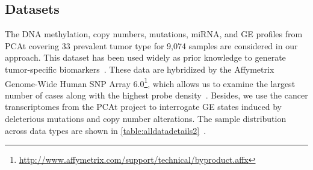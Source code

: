 \subsection{Datasets}
The DNA methylation, copy numbers, mutations, miRNA, and GE profiles from PCAt covering 33 prevalent tumor type for 9,074 samples are considered in our approach. This dataset has been used widely as prior knowledge to generate tumor-specific biomarkers~\cite{way2018machine,hoadley2018cell,malta2018machine}. These data are hybridized by the Affymetrix Genome-Wide Human SNP Array 6.0\footnote{\url{http://www.affymetrix.com/support/technical/byproduct.affx}}, which allows us to examine the largest number of cases along with the highest probe density~\cite{31Park}. Besides, we use the cancer transcriptomes from the PCAt project to interrogate GE states induced by deleterious mutations and copy number alterations. The sample distribution across data types are shown in \cref{table:alldatadetails2}~\cite{weinstein2013cancer}. 

